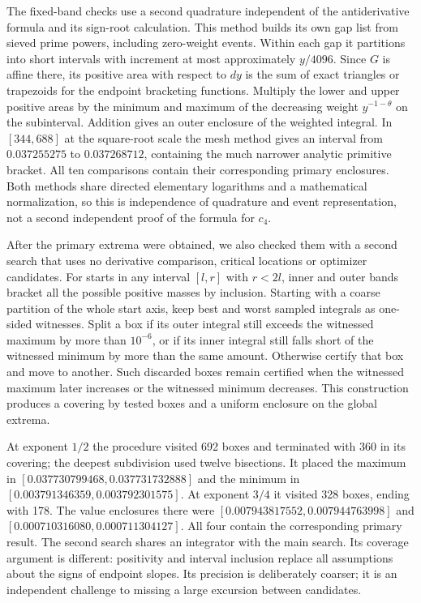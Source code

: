 \documentclass[12pt,letterpaper]{article}
\begin{document}
The fixed-band checks use a second quadrature independent of the antiderivative formula and its sign-root calculation. This method builds its own gap list from sieved prime powers, including zero-weight events. Within each gap it partitions into short intervals with increment at most approximately $y/4096$. Since $G$ is affine there, its positive area with respect to $dy$ is the sum of exact triangles or trapezoids for the endpoint bracketing functions. Multiply the lower and upper positive areas by the minimum and maximum of the decreasing weight $y^{-1-\theta}$ on the subinterval. Addition gives an outer enclosure of the weighted integral. In $[344,688]$ at the square-root scale the mesh method gives an interval from $0.037255275$ to $0.037268712$, containing the much narrower analytic primitive bracket. All ten comparisons contain their corresponding primary enclosures. Both methods share directed elementary logarithms and a mathematical normalization, so this is independence of quadrature and event representation, not a second independent proof of the formula for $c_4$.

After the primary extrema were obtained, we also checked them with a second search that uses no derivative comparison, critical locations or optimizer candidates. For starts in any interval $[l,r]$ with $r<2l$, inner and outer bands bracket all the possible positive masses by inclusion. Starting with a coarse partition of the whole start axis, keep best and worst sampled integrals as one-sided witnesses. Split a box if its outer integral still exceeds the witnessed maximum by more than $10^{-6}$, or if its inner integral still falls short of the witnessed minimum by more than the same amount. Otherwise certify that box and move to another. Such discarded boxes remain certified when the witnessed maximum later increases or the witnessed minimum decreases. This construction produces a covering by tested boxes and a uniform enclosure on the global extrema.

At exponent $1/2$ the procedure visited 692 boxes and terminated with 360 in its covering; the deepest subdivision used twelve bisections. It placed the maximum in $[0.037730799468,0.037731732888]$ and the minimum in $[0.003791346359,0.003792301575]$. At exponent $3/4$ it visited 328 boxes, ending with 178. The value enclosures there were $[0.007943817552,0.007944763998]$ and $[0.000710316080,0.000711304127]$. All four contain the corresponding primary result. The second search shares an integrator with the main search. Its coverage argument is different: positivity and interval inclusion replace all assumptions about the signs of endpoint slopes. Its precision is deliberately coarser; it is an independent challenge to missing a large excursion between candidates.
\end{document}
